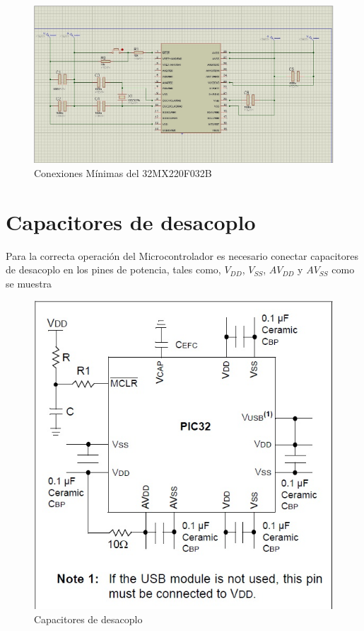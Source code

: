\documentclass[12pt,letterpaper,twoside]{book}
\begin{document}
\begin{figure}
\centering
\includegraphics[width=5in]{conexionesminimas.jpg}
\caption{Conexiones Mínimas del 32MX220F032B}
\label{fig5}
\end{figure}


\section{Capacitores de desacoplo}

Para la correcta operación del Microcontrolador es necesario conectar capacitores de desacoplo en los pines de potencia, tales como, $V_{DD}$, $V_{SS}$, $AV_{DD}$ y $AV_{SS}$ como se muestra 

\begin{figure}
\centering
\includegraphics[width=5in]{capacitoresdesacoplo.jpg}
\caption{Capacitores de desacoplo}
\label{fig6}
\end{figure}
\end{document}
